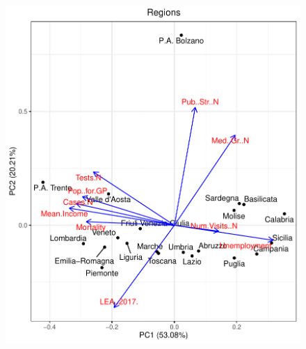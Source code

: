 \documentclass[compress]{beamer}
\begin{document}
\begin{frame}
\begin{figure}[H]
\begin{minipage}{.5\textwidth}
  \includegraphics[width=\linewidth,]{Pic/Regions_FULL_PCA.pdf}
\end{minipage}
\end{figure}
\end{frame}
\end{document}
